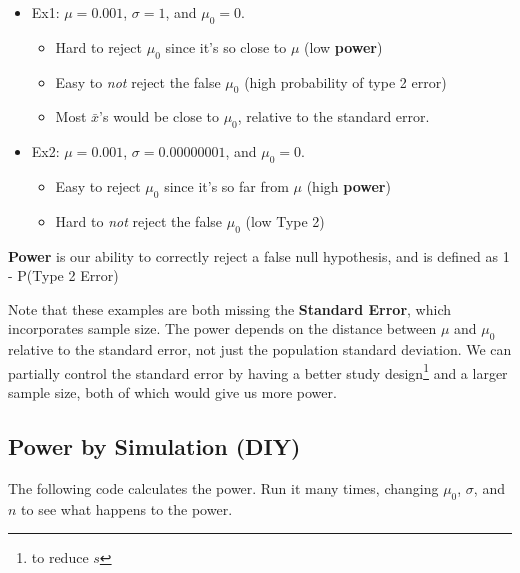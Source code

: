 \documentclass[
  letterpaper,
  DIV=11,
  numbers=noendperiod]{scrreprt}
\providecommand{\tightlist}{%
  \setlength{\itemsep}{0pt}\setlength{\parskip}{0pt}}\usepackage{longtable,booktabs,array}
\begin{document}
\begin{itemize}
\tightlist
\item
  Ex1: \(\mu = 0.001\), \(\sigma = 1\), and \(\mu_0 = 0\).

  \begin{itemize}
  \tightlist
  \item
    Hard to reject \(\mu_0\) since it's so close to \(\mu\) (low
    \textbf{power})
  \item
    Easy to \emph{not} reject the false \(\mu_0\) (high probability of
    type 2 error)
  \item
    Most \(\bar x\)'s would be close to \(\mu_0\), relative to the
    standard error.
  \end{itemize}
\item
  Ex2: \(\mu = 0.001\), \(\sigma = 0.00000001\), and \(\mu_0 = 0\).

  \begin{itemize}
  \tightlist
  \item
    Easy to reject \(\mu_0\) since it's so far from \(\mu\) (high
    \textbf{power})
  \item
    Hard to \emph{not} reject the false \(\mu_0\) (low Type 2)
  \end{itemize}
\end{itemize}

\textbf{Power} is our ability to correctly reject a false null
hypothesis, and is defined as 1 - P(Type 2 Error)

Note that these examples are both missing the \textbf{Standard Error},
which incorporates sample size. The power depends on the distance
between \(\mu\) and \(\mu_0\) relative to the standard error, not just
the population standard deviation. We can partially control the standard
error by having a better study design\footnote{to reduce \(s\)} and a
larger sample size, both of which would give us more power.

\hypertarget{power-by-simulation-diy}{%
\subsection{Power by Simulation (DIY)}\label{power-by-simulation-diy}}

The following code calculates the power. Run it many times, changing
\(\mu_0\), \(\sigma\), and \(n\) to see what happens to the power.
\end{document}
